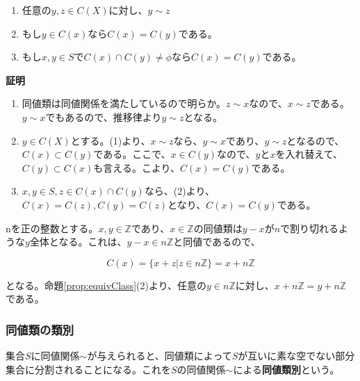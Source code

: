 \documentclass[dvipdfmx,autodetect-engine]{jsarticle}
\begin{document}
\label{defi:equivClass}

\label{prop:equivClass}

\begin{enumerate}
\renewcommand{\labelenumi}{(\arabic{enumi})}
\item 任意の$y,z \in C(X)$に対し、$y \sim z$
\item もし$y \in C(x)$なら$C(x) = C(y)$である。
\item もし$x,y \in S$で$C(x) \cap C(y) \neq \phi$なら$C(x) = C(y)$である。
\end{enumerate}

{\bf 証明}

\begin{enumerate}
\renewcommand{\labelenumi}{(\arabic{enumi})}
\item 同値類は同値関係を満たしているので明らか。$z \sim x$なので、$x \sim z$である。$y \sim x$でもあるので、推移律より$y \sim z$となる。
\item $y \in C(X)$とする。(1)より、$x \sim z$なら、$y \sim x$であり、$y \sim z$となるので、$C(x) \subset C(y)$である。ここで、$x \in C(y)$なので、$y$と$x$を入れ替えて、
$C(y) \subset C(x)$も言える。こより、$C(x) = C(y)$である。
\item $x,y \in S, z \in C(x) \cap C(y)$なら、(2)より、$C(x) = C(z), C(y) = C(z)$となり、$C(x) = C(y)$である。
\end{enumerate}

\exam nを正の整数とする。$x, y \in \mathbb{Z}$であり、$x \in \mathbb{Z}$の同値類は$y - x$が$n$で割り切れるような$y$全体となる。これは、$y - x \in n\mathbb{Z}$と同値であるので、

$$
C(x) = \{x + z | z \in n\mathbb{Z}\} = x + n\mathbb{Z}
$$

となる。命題\ref{prop:equivClass}(2)より、任意の$y \in n\mathbb{Z}$に対し、$x + n\mathbb{Z} = y + n\mathbb{Z}$である。

\subsubsection{同値類の類別}
集合$S$に同値関係$\sim$が与えられると、同値類によって$S$が互いに素な空でない部分集合に分割されることになる。これを$S$の同値関係$\sim$による{\bf 同値類別}という。

\label{defi:quotientSet}
\end{document}
